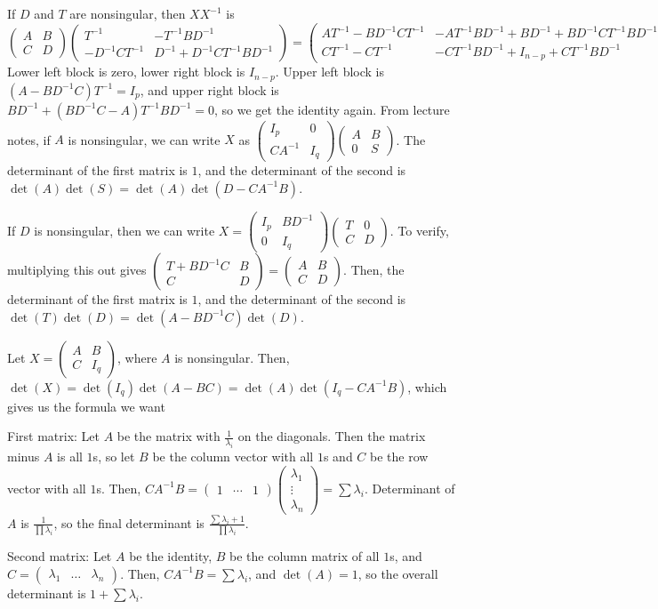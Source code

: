 \documentclass{article}
\newcommand{\openm}{\begin{pmatrix}}
\newcommand{\closem}{\end{pmatrix}}
\begin{document}
If $D$ and $T$ are nonsingular, then $XX^{-1}$ is
\[\openm A&B\\C&D\closem\openm T^{-1}&-T^{-1}BD^{-1}\\-D^{-1}CT^{-1}&D^{-1}+D^{-1}CT^{-1}BD^{-1}\closem
=\openm AT^{-1}-BD^{-1}CT^{-1}&-AT^{-1}BD^{-1}+BD^{-1}+BD^{-1}CT^{-1}BD^{-1}\\CT^{-1}-CT^{-1}&-CT^{-1}BD^{-1}+I_{n-p}+CT^{-1}BD^{-1}\closem\]
Lower left block is zero, lower right block is $I_{n-p}$. Upper left block is $(A-BD^{-1}C)T^{-1}=I_p$, and upper right block is $BD^{-1}+(BD^{-1}C-A)T^{-1}BD^{-1}=0$, so we get the identity again.
From lecture notes, if $A$ is nonsingular, we can write $X$ as $\openm I_p&0\\CA^{-1}&I_q\closem\openm A&B\\0&S\closem$. The determinant of the first matrix is $1$, and the determinant of the second is $\det(A)\det(S)=\det(A)\det(D-CA^{-1}B)$.

If $D$ is nonsingular, then we can write $X=\openm I_p&BD^{-1}\\0&I_q\closem\openm T&0\\C&D\closem$. To verify, multiplying this out gives $\openm T+BD^{-1}C&B\\C&D\closem=\openm A&B\\C&D\closem$. Then, the determinant of the first matrix is $1$, and the determinant of the second is $\det(T)\det(D)=\det(A-BD^{-1}C)\det(D)$.

Let $X=\openm A&B\\C&I_q\closem$, where $A$ is nonsingular. Then, $\det(X)=\det(I_q)\det(A-BC)=\det(A)\det(I_q-CA^{-1}B)$, which gives us the formula we want

First matrix: Let $A$ be the matrix with $\frac{1}{\lambda_i}$ on the diagonals. Then the matrix minus $A$ is all $1$s, so let $B$ be the column vector with all $1$s and $C$ be the row vector with all $1$s. Then, $CA^{-1}B=\openm1&\cdots&1\closem\openm\lambda_1\\\vdots\\\lambda_n\closem=\sum\lambda_i$. Determinant of $A$ is $\frac{1}{\prod\lambda_i}$, so the final determinant is $\frac{\sum\lambda_i+1}{\prod\lambda_i}$.

Second matrix: Let $A$ be the identity, $B$ be the column matrix of all $1$s, and $C=\openm\lambda_1&\hdots&\lambda_n\closem$. Then, $CA^{-1}B=\sum\lambda_i$, and $\det(A)=1$, so the overall determinant is $1+\sum\lambda_i$.
\end{document}
